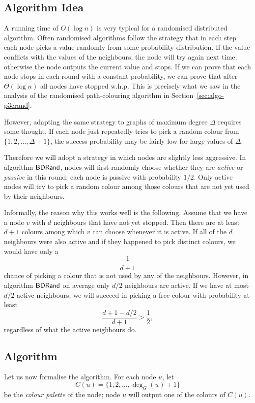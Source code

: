 \subsection{Algorithm Idea}

A running time of $O(\log n)$ is very typical for a randomised distributed algorithm. Often randomised algorithms follow the strategy that in each step each node picks a value randomly from some probability distribution. If the value conflicts with the values of the neighbours, the node will try again next time; otherwise the node outputs the current value and stops. If we can prove that each node stops in each round with a constant probability, we can prove that after $\Theta(\log n)$ all nodes have stopped w.h.p. This is precisely what we saw in the analysis of the randomised path-colouring algorithm in Section~\ref{sec:algo-p3crand}.

However, adapting the same strategy to graphs of maximum degree $\Delta$ requires some thought. If each node just repeatedly tries to pick a random colour from $\{1,2,\dotsc,\Delta+1\}$, the success probability may be fairly low for large values of $\Delta$.

Therefore we will adopt a strategy in which nodes are slightly less aggressive. In algorithm $\textup{\sffamily BDRand}$, nodes will first randomly choose whether they are \emph{active} or \emph{passive} in this round; each node is passive with probability $1/2$. Only active nodes will try to pick a random colour among those colours that are not yet used by their neighbours.

Informally, the reason why this works well is the following. Assume that we have a node $v$ with $d$ neighbours that have not yet stopped. Then there are at least $d+1$ colours among which $v$ can choose whenever it is active. If all of the $d$ neighbours were also active and if they happened to pick distinct colours, we would have only a \[\frac{1}{d+1}\] chance of picking a colour that is not used by any of the neighbours. However, in algorithm $\textup{\sffamily BDRand}$ on average only $d/2$ neighbours are active. If we have at most $d/2$ active neighbours, we will succeed in picking a free colour with probability at least \[\frac{d+1 - d/2}{d+1} > \frac{1}{2},\] regardless of what the active neighbours do.


\subsection{Algorithm}

Let us now formalise the algorithm. For each node $u$, let
\[
    C(u) = \{1,2,\dotsc,\deg_G(u)+1\}
\]
be the \emph{colour palette} of the node; node $u$ will output one of the colours of $C(u)$. 

